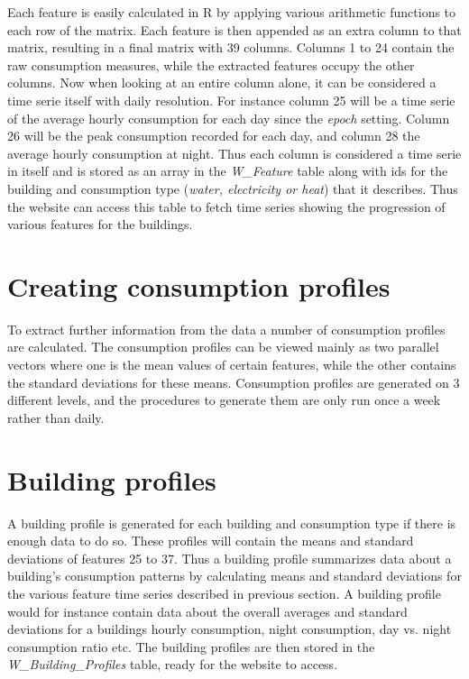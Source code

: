 Each feature is easily calculated in R by applying various arithmetic functions to each row of the matrix. Each feature is then appended as an extra column to that matrix, resulting in a final matrix with 39 columns. Columns 1 to 24 contain the raw consumption measures, while the extracted features occupy the other columns.
Now when looking at an entire column alone, it can be considered a time serie itself with daily resolution. For instance column 25 will be a time serie of the average hourly consumption for each day since the \emph{epoch} setting. Column 26 will be the peak consumption recorded for each day, and column 28 the average hourly consumption at night. Thus each column is considered a time serie in itself and is stored as an array in the \emph{W\_Feature} table along with ids for the building and consumption type (\emph{water, electricity or heat}) that it describes. Thus the website can access this table to fetch time series showing the progression of various features for the buildings.
\section{Creating consumption profiles}
To extract further information from the data a number of consumption profiles are calculated. The consumption profiles can be viewed mainly as two parallel vectors where one is the mean values of certain features, while the other contains the standard deviations for these means. Consumption profiles are generated on 3 different levels, and the procedures to generate them are only run once a week rather than daily. 
\section*{Building profiles}
A building profile is generated for each building and consumption type if there is enough data to do so. These profiles will contain the means and standard deviations of features 25 to 37. Thus a building profile summarizes data about a building's consumption patterns by calculating means and standard deviations for the various feature time series described in previous section. A building profile would for instance contain data about the overall averages and standard deviations for a buildings hourly consumption, night consumption, day vs. night consumption ratio etc. The building profiles are then stored in the \emph{W\_Building\_Profiles} table, ready for the website to access.
